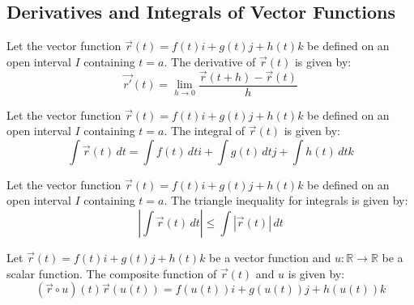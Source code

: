 \documentclass[11pt]{report}
\begin{document}
\subsection{Derivatives and Integrals of Vector Functions}
\begin{definition}[Derivative]
    Let the vector function $\vec{r}(t) = f(t)i + g(t)j + h(t)k$ be defined on an open interval $I$ containing $t = a$. The derivative of $\vec{r}(t)$ is given by:
    \begin{equation}
        \vec{r'}(t) = \lim_{h \to 0} \frac{\vec{r}(t+h) - \vec{r}(t)}{h}
    \end{equation}
\end{definition}
\begin{definition}[Integration]
    Let the vector function $\vec{r}(t) = f(t)i + g(t)j + h(t)k$ be defined on an open interval $I$ containing $t = a$. The integral of $\vec{r}(t)$ is given by:
    \begin{equation}
        \int \vec{r}(t) \, dt = \int f(t) \, dt i + \int g(t) \, dt j + \int h(t) \, dt k
    \end{equation}
\end{definition}
\begin{definition}
    Let the vector function $\vec{r}(t) = f(t)i + g(t)j + h(t)k$ be defined on an open interval $I$ containing $t = a$. The triangle inequality for integrals is given by:
    \begin{equation}
        \left| \int \vec{r}(t) \, dt \right| \le \int \left| \vec{r}(t) \right| \, dt
    \end{equation}
\end{definition}
\begin{definition}
    Let $\vec{r}(t) = f(t)i + g(t)j + h(t)k$ be a vector function and $u: \mathbb{R} \to \mathbb{R}$ be a scalar function. The composite function of $\vec{r}(t)$ and $u$ is given by:
    \begin{equation}
        (\vec{r}\circ u)(t) \vec{r}(u(t)) = f(u(t))i + g(u(t))j + h(u(t))k
    \end{equation}
\end{definition}
\end{document}
